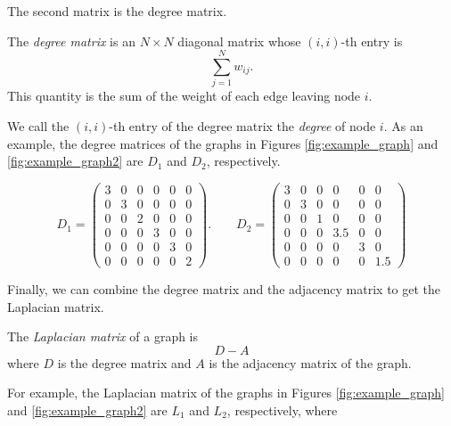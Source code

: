The second matrix is the degree matrix. 
\begin{definition} The \emph{degree matrix} is an $N \times N$ diagonal matrix whose $(i,i)$-th entry is
\[ 
\sum_{j=1}^N w_{ij}.
\]
This quantity is the sum of the weight of each edge leaving node $i$.
\end{definition}
We call the $(i, i)$-th entry of the degree matrix the \emph{degree} of node $i$. As an example, the degree matrices of the graphs in Figures \ref{fig:example_graph} and \ref{fig:example_graph2} are $D_1$ and $D_2$, respectively.

\[
D_1 = \begin{pmatrix}
3 & 0 & 0 & 0 & 0 & 0\\
0 & 3 & 0 & 0 & 0 & 0\\
0 & 0 & 2 & 0 & 0 & 0\\
0 & 0 & 0 & 3 & 0 & 0\\
0 & 0 & 0 & 0 & 3 & 0\\
0 & 0 & 0 & 0 & 0 & 2
\end{pmatrix}. \qquad D_2 = 
 \begin{pmatrix}
3 & 0 & 0 & 0 & 0 & 0\\
0 & 3 & 0 & 0 & 0 & 0\\
0 & 0 & 1 & 0 & 0 & 0\\
0 & 0 & 0 & 3.5 & 0 & 0\\
0 & 0 & 0 & 0 & 3 & 0\\
0 & 0 & 0 & 0 & 0 & 1.5
\end{pmatrix}
\]

Finally, we can combine the degree matrix and the adjacency matrix to get the Laplacian matrix.
\begin{definition}
The \emph{Laplacian matrix} of a graph is 
\[D - A \]
where $D$ is the degree matrix and $A$ is the adjacency matrix of the graph.
\end{definition}

For example, the Laplacian matrix of the graphs in Figures \ref{fig:example_graph} and \ref{fig:example_graph2} are $L_1$ and $L_2$, respectively, where

